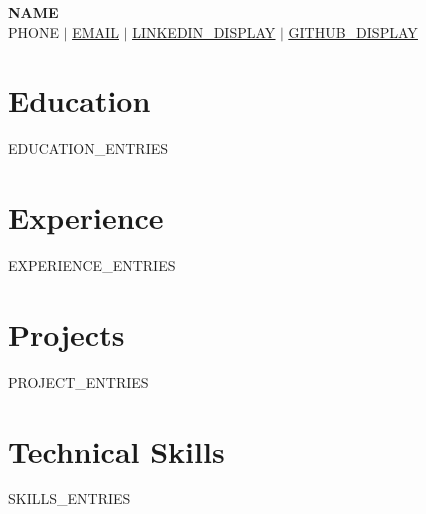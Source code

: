 \documentclass[letterpaper,11pt]{article}
\newcommand{\resumeSubHeadingListStart}{\begin{itemize}[leftmargin=0.15in, label={}]}
\newcommand{\resumeSubHeadingListEnd}{\end{itemize}}
\begin{document}
\begin{center}
    \textbf{\Huge \scshape {{NAME}}} \\ \vspace{1pt}
    \small {{PHONE}} $|$ \href{mailto:{{EMAIL}}}{\underline{{{EMAIL}}}} $|$
    \href{{{LINKEDIN}}}{\underline{{{LINKEDIN_DISPLAY}}}} $|$
    \href{{{GITHUB}}}{\underline{{{GITHUB_DISPLAY}}}}
\end{center}

\section{Education}
  \resumeSubHeadingListStart
{{EDUCATION_ENTRIES}}
  \resumeSubHeadingListEnd

\section{Experience}
  \resumeSubHeadingListStart
{{EXPERIENCE_ENTRIES}}
  \resumeSubHeadingListEnd

\section{Projects}
    \resumeSubHeadingListStart
{{PROJECT_ENTRIES}}
    \resumeSubHeadingListEnd

\section{Technical Skills}
 \begin{itemize}[leftmargin=0.15in, label={}]
    \small{\item{
{{SKILLS_ENTRIES}}
    }}
 \end{itemize}

\end{document}
